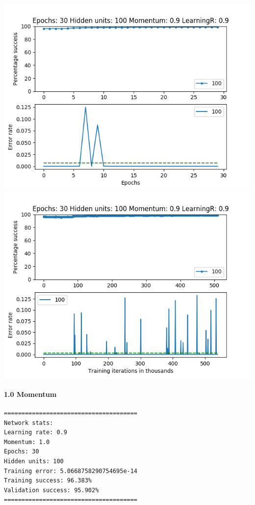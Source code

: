 \documentclass[11pt]{article}
\makeatletter
\def\maxwidth{\ifdim\Gin@nat@width>\linewidth\linewidth
    \else\Gin@nat@width\fi}
\let\Oldincludegraphics\includegraphics
\renewcommand{\includegraphics}[1]{\Oldincludegraphics[width=.8\maxwidth]{#1}}
\makeatother
\begin{document}
\includegraphics{Experiment1/E1_NN_Epoch_Momentum_0.9_30Epochs_100_LR_0.9_Hiddenunits.png}
\includegraphics{Experiment1/E1_NN_Training_Momentum_0.9_30Epochs_100_LR_0.9_Hiddenunits.png}

\hypertarget{momentum-10}{%
\paragraph{1.0 Momentum}\label{momentum-10}}

\begin{verbatim}
======================================
Network stats: 
Learning rate: 0.9
Momentum: 1.0
Epochs: 30
Hidden units: 100
Training error: 5.0668758290754695e-14
Training success: 96.383%
Validation success: 95.902%
======================================
\end{verbatim}
\end{document}
